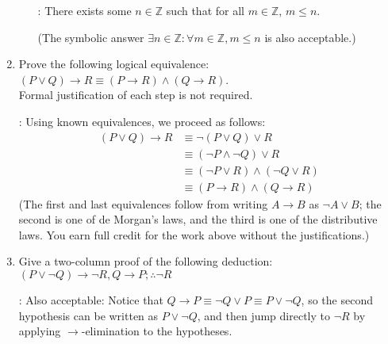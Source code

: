 \documentclass[12pt]{article}
\newcommand{\points}[1]{\marginpar{\hspace{24pt}[#1]}}
\newcommand{\Z}{\mathbb{Z}}
\begin{document}
\begin{enumerate}
\begin{enumerate}
\bigskip

: There exists some $n\in\Z$ such that for all $m\in\Z$, $m\leq n$.

(The symbolic answer $\exists n\in\Z : \forall  m\in\Z, m\leq n$ is also acceptable.)

\bigskip


\end{enumerate}
\newpage

\item Prove the following logical equivalence: $(P\vee Q)\to R\equiv (P\to R)\wedge (Q\to R)$. \points{4}\\ Formal justification of each step is not required.


\bigskip

:  Using known equivalences, we proceed as follows:
\begin{align*}
 (P\vee Q)\to R &\equiv \neg(P\vee Q)\vee R\\
&\equiv (\neg P\wedge \neg Q)\vee R\\
&\equiv (\neg P\vee R)\wedge (\neg Q\vee R)\\
&\equiv (P\to R)\wedge (Q\to R)
\end{align*}
(The first and last equivalences follow from writing $A\to B$ as $\neg A\vee B$; the second is one of de Morgan's laws, and the third is one of the distributive laws. You earn full credit for the work above without the justifications.)

\bigskip


\item Give a two-column proof of the following deduction: $(P\vee \neg Q)\to \neg R, Q\to P; \therefore \neg R$ \points{7}


\bigskip

:
Also acceptable: Notice that $Q\to P\equiv \neg Q\vee P \equiv P\vee \neg Q$, so the second hypothesis can be written as $P\vee \neg Q$, and then jump directly to $\neg R$ by applying $\to$-elimination to the hypotheses.


\end{enumerate}
\end{document}
